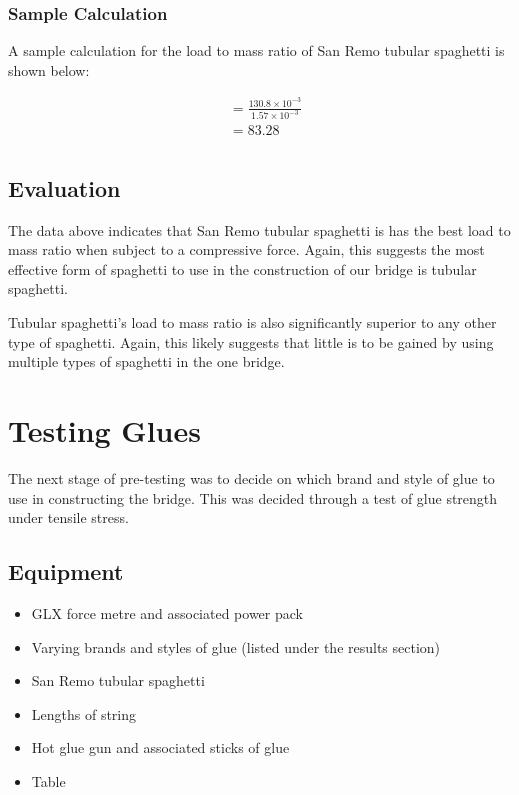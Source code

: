 \documentclass[a4paper,11pt]{article}
\begin{document}
\subsubsection{Sample Calculation}

A sample calculation for the load to mass ratio of San Remo tubular spaghetti is
shown below:

$$
\begin{aligned}
& = \frac{130.8 \times 10^{-3}}{1.57 \times{10^{-3}}} \\
& = 83.28 \\
\end{aligned}
$$


\subsection{Evaluation}

The data above indicates that San Remo tubular spaghetti is has the best load
to mass ratio when subject to a compressive force.
Again, this suggests the most effective form of spaghetti to use in the
construction of our bridge is tubular spaghetti.

Tubular spaghetti's load to mass ratio is also significantly superior to any
other type of spaghetti.
Again, this likely suggests that little is to be gained by using multiple types
of spaghetti in the one bridge.




\section{Testing Glues}

The next stage of pre-testing was to decide on which brand and style of glue to
use in constructing the bridge.
This was decided through a test of glue strength under tensile stress.


\subsection{Equipment}

\begin{itemize}
\item GLX force metre and associated power pack
\item Varying brands and styles of glue (listed under the results section)
\item San Remo tubular spaghetti
\item Lengths of string
\item Hot glue gun and associated sticks of glue
\item Table
\end{itemize}
\end{document}
